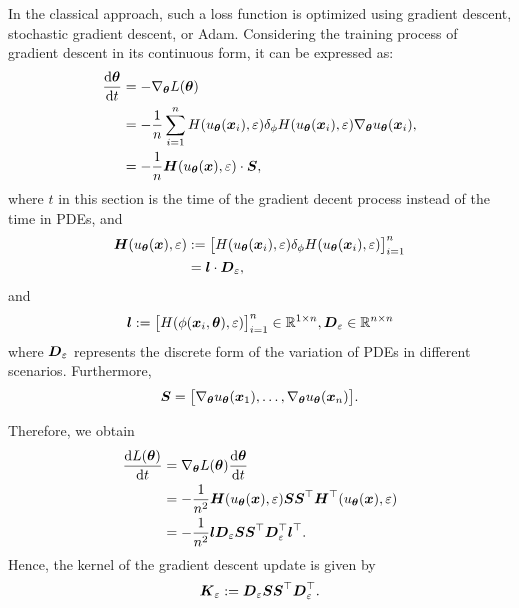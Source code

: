 In the classical approach, such a loss function is optimized using gradient descent, stochastic gradient descent, or Adam. Considering the training process of gradient descent in its continuous form, it can be expressed as:
\begin{align}
    \frac{\mathrm{d} \boldsymbol{\theta}}{\mathrm{d} t} 
    &= -\nabla_{\boldsymbol{\theta}}L(\boldsymbol{\theta}) 
    \notag\\&= -\frac{1}{n} \sum_{i=1}^n H(u_{\boldsymbol{\theta}}(\boldsymbol{x}_i),\varepsilon)\delta_{\phi}H(u_{\boldsymbol{\theta}}(\boldsymbol{x}_i),\varepsilon)\nabla_{\boldsymbol{\theta}}u_{\boldsymbol{\theta}}(\boldsymbol{x}_i), \notag \\
    &= -\frac{1}{n} \boldsymbol{H}(u_{\boldsymbol{\theta}}(\boldsymbol{x}),\varepsilon) \cdot \boldsymbol{S},
\end{align}
where $t$ in this section is the time of the gradient decent process instead of the time in PDEs, and
\begin{align}
    \boldsymbol{H}(u_{\boldsymbol{\theta}}(\boldsymbol{x}),\varepsilon) 
    &:= \big[ H(u_{\boldsymbol{\theta}}(\boldsymbol{x}_i),\varepsilon)\delta_{\phi}H(u_{\boldsymbol{\theta}}(\boldsymbol{x}_i),\varepsilon)\big]_{i=1}^n \notag \\
    &= \boldsymbol{l} \cdot \boldsymbol{D}_\varepsilon,
\end{align}
and
\begin{align}
    \boldsymbol{l} := \big[ H(\phi(\boldsymbol{x}_i,\boldsymbol{\theta}),\varepsilon) \big]_{i=1}^n \in \mathbb{R}^{1 \times n},  \boldsymbol{D}_\varepsilon \in \mathbb{R}^{n \times n}
\end{align}where $\boldsymbol{D}_\varepsilon$ represents the discrete form of the variation of PDEs in different scenarios. Furthermore,
\begin{align}
    \boldsymbol{S} = \big[ \nabla_{\boldsymbol{\theta}}u_{\boldsymbol{\theta}}(\boldsymbol{x}_1),\dots, \nabla_{\boldsymbol{\theta}}u_{\boldsymbol{\theta}}(\boldsymbol{x}_n) \big].
\end{align}

Therefore, we obtain  
\begin{align}
    \frac{\mathrm{d} L(\boldsymbol{\theta})}{\mathrm{d} t} &= \nabla_{\boldsymbol{\theta}}L(\boldsymbol{\theta}) \frac{\mathrm{d} \boldsymbol{\theta}}{\mathrm{d} t} \notag \\
    &= -\frac{1}{n^2} \boldsymbol{H}(u_{\boldsymbol{\theta}}(\boldsymbol{x}),\varepsilon) \boldsymbol{S} \boldsymbol{S}^{\top} \boldsymbol{H}^{\top}(u_{\boldsymbol{\theta}}(\boldsymbol{x}),\varepsilon) \notag \\
    &= -\frac{1}{n^2} \boldsymbol{l} \boldsymbol{D}_\varepsilon \boldsymbol{S} \boldsymbol{S}^{\top} \boldsymbol{D}_\varepsilon^{\top} \boldsymbol{l}^{\top}.
\end{align}
Hence, the kernel of the gradient descent update is given by  
\begin{align}
    \boldsymbol{K}_\varepsilon := \boldsymbol{D}_\varepsilon \boldsymbol{S} \boldsymbol{S}^{\top} \boldsymbol{D}_\varepsilon^{\top}.
\end{align}

